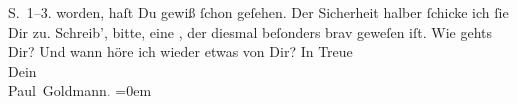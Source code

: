 \begin{ledgroupsized}[t]{13cm}
{{{                     S. 1–3.}}}\label{K_L02624-1h} worden, haſt Du gewiß ſchon geſehen. Der Sicherheit
               halber ſchicke ich ſie Dir zu. Schreib’, bitte, eine \label{K_L02624-2v}\label{K_L02624-2h}, der diesmal beſonders brav geweſen iſt.\pend
           \pstart
           Wie gehts Dir? Und wann höre ich wieder etwas von Dir?\pend
           \pstart
           In Treue{\\[\baselineskip]}Dein{\\[\baselineskip]}\spacefill\mbox{Paul Goldmann\textcolor{gray}{.}}\pend
           \leftskip=0em{}
         
         \endnumbering{}\end{ledgroupsized}  \newcommand{\dateiname}{L02624}\newcommand{\titel}{Paul Goldmann an Arthur Schnitzler, 4. 12. 1894}\newcommand{\editorInnen}{Martin Anton Müller und Laura Untner}
      